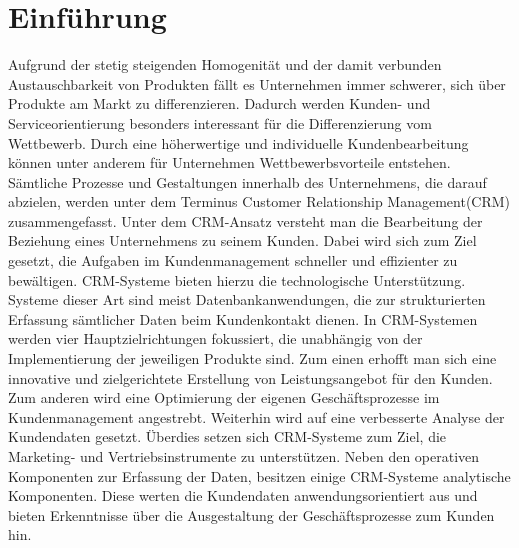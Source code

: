 \chapter{Einführung}
\label{ch:Einfuehrung}

Aufgrund der stetig steigenden Homogenität und der damit verbunden Austauschbarkeit von Produkten fällt es Unternehmen immer schwerer, sich über Produkte am Markt zu differenzieren. Dadurch werden Kunden- und Serviceorientierung besonders interessant für die Differenzierung vom Wettbewerb. Durch eine höherwertige und individuelle Kundenbearbeitung können unter anderem für Unternehmen Wettbewerbsvorteile entstehen. Sämtliche Prozesse und Gestaltungen innerhalb des Unternehmens, die darauf abzielen, werden unter dem Terminus Customer Relationship Management(CRM) zusammengefasst. Unter dem CRM-Ansatz versteht man die Bearbeitung der Beziehung eines Unternehmens zu seinem Kunden. Dabei wird sich zum Ziel gesetzt, die Aufgaben im Kundenmanagement schneller und effizienter zu bewältigen. CRM-Systeme bieten hierzu die technologische Unterstützung. Systeme dieser Art sind meist Datenbankanwendungen, die zur strukturierten Erfassung sämtlicher Daten beim Kundenkontakt dienen. In CRM-Systemen werden vier Hauptzielrichtungen fokussiert, die unabhängig von der Implementierung der jeweiligen Produkte sind. Zum einen erhofft man sich eine innovative und zielgerichtete Erstellung von Leistungsangebot für den Kunden. Zum anderen wird eine Optimierung der eigenen Geschäftsprozesse im Kundenmanagement angestrebt. Weiterhin wird auf eine verbesserte Analyse der Kundendaten gesetzt. Überdies setzen sich CRM-Systeme zum Ziel, die Marketing- und Vertriebsinstrumente zu unterstützen. Neben den operativen Komponenten zur Erfassung der Daten, besitzen einige CRM-Systeme analytische Komponenten. Diese werten die Kundendaten anwendungsorientiert aus und bieten Erkenntnisse über die Ausgestaltung der Geschäftsprozesse zum Kunden hin.

